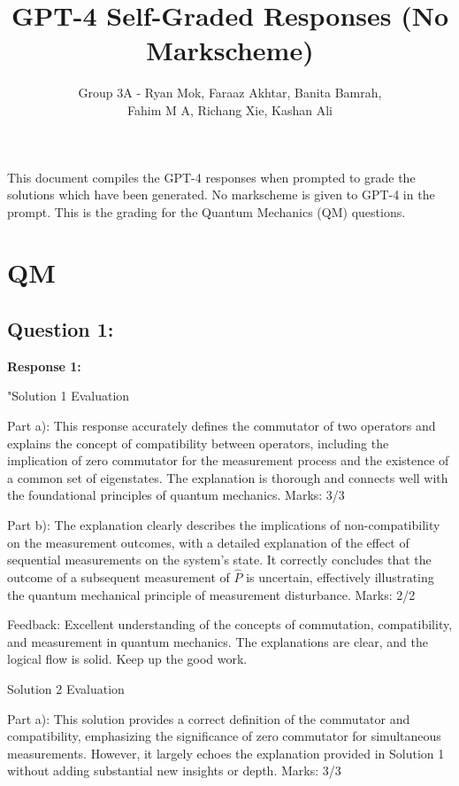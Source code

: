 \documentclass[a4paper,11pt]{article}
\begin{document}
\title{GPT-4 Self-Graded Responses (No Markscheme)}
\author{Group 3A - Ryan Mok, Faraaz Akhtar, Banita Bamrah, \\ Fahim M A, Richang Xie, Kashan Ali }
\date{}
\maketitle

This document compiles the GPT-4 responses when prompted to grade the solutions which have been generated. No markscheme is given to GPT-4 in the prompt. This is the grading for the Quantum Mechanics (QM) questions. 

\section{QM}

\subsection*{Question 1:}

\textbf{Response 1:}

"Solution 1 Evaluation

Part a): This response accurately defines the commutator of two operators and explains the concept of compatibility between operators, including the implication of zero commutator for the measurement process and the existence of a common set of eigenstates. The explanation is thorough and connects well with the foundational principles of quantum mechanics. Marks: 3/3

Part b): The explanation clearly describes the implications of non-compatibility on the measurement outcomes, with a detailed explanation of the effect of sequential measurements on the system's state. It correctly concludes that the outcome of a subsequent measurement of \( \hat{P} \) is uncertain, effectively illustrating the quantum mechanical principle of measurement disturbance. Marks: 2/2

Feedback: Excellent understanding of the concepts of commutation, compatibility, and measurement in quantum mechanics. The explanations are clear, and the logical flow is solid. Keep up the good work.

Solution 2 Evaluation

Part a): This solution provides a correct definition of the commutator and compatibility, emphasizing the significance of zero commutator for simultaneous measurements. However, it largely echoes the explanation provided in Solution 1 without adding substantial new insights or depth. Marks: 3/3
\end{document}
